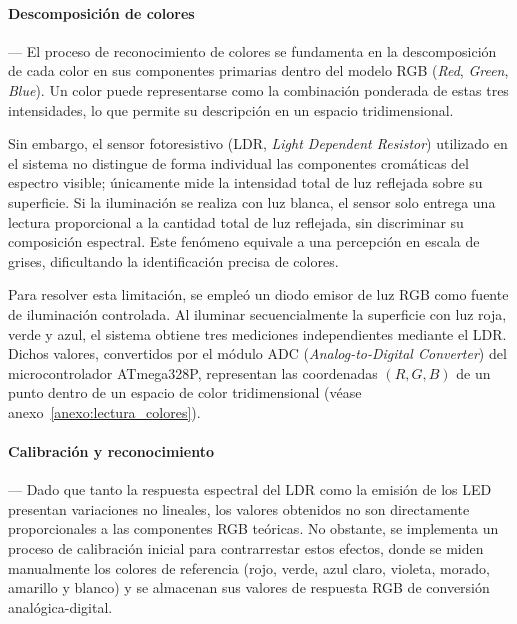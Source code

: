     \paragraph*{\textbf{Descomposición de colores}}---
    El proceso de reconocimiento de colores se fundamenta en la descomposición de cada color en sus componentes primarias dentro del modelo RGB (\textit{Red}, \textit{Green}, \textit{Blue}). Un color puede representarse como la combinación ponderada de estas tres intensidades, lo que permite su descripción en un espacio tridimensional.  

    \vspace{1em}

    Sin embargo, el sensor fotoresistivo (LDR, \textit{Light Dependent Resistor}) utilizado en el sistema no distingue de forma individual las componentes cromáticas del espectro visible; únicamente mide la intensidad total de luz reflejada sobre su superficie. Si la iluminación se realiza con luz blanca, el sensor solo entrega una lectura proporcional a la cantidad total de luz reflejada, sin discriminar su composición espectral. Este fenómeno equivale a una percepción en escala de grises, dificultando la identificación precisa de colores.

    \vspace{1em}
    
    Para resolver esta limitación, se empleó un diodo emisor de luz RGB como fuente de iluminación controlada. Al iluminar secuencialmente la superficie con luz roja, verde y azul, el sistema obtiene tres mediciones independientes mediante el LDR. Dichos valores, convertidos por el módulo ADC (\textit{Analog-to-Digital Converter}) del microcontrolador ATmega328P, representan las coordenadas $(R, G, B)$ de un punto dentro de un espacio de color tridimensional (véase anexo~\ref{anexo:lectura_colores}).

    \vspace{1em}

    \paragraph*{\textbf{Calibración y reconocimiento}}---
    Dado que tanto la respuesta espectral del LDR como la emisión de los LED presentan variaciones no lineales, los valores obtenidos no son directamente proporcionales a las componentes RGB teóricas. No obstante, se implementa un proceso de calibración inicial para contrarrestar estos efectos, donde se miden manualmente los colores de referencia (rojo, verde, azul claro, violeta, morado, amarillo y blanco) y se almacenan sus valores de respuesta RGB de conversión analógica-digital.

